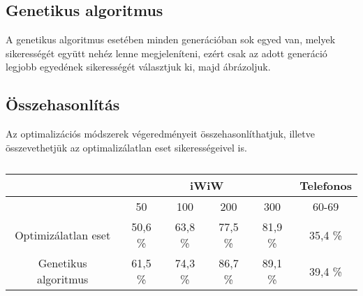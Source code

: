 \documentclass[12pt]{article}
\begin{document}
\subsection{Genetikus algoritmus}
A genetikus algoritmus esetében minden generációban sok egyed van, melyek sikerességét együtt nehéz lenne megjeleníteni, ezért csak az adott generáció legjobb egyedének sikerességét választjuk ki, majd ábrázoljuk.
\begin{figure}[H]
	\centering
	
	\caption{}
	\label{}
\end{figure}

\subsection{Összehasonlítás}
Az optimalizációs módszerek végeredményeit összehasonlíthatjuk, illetve összevethetjük az optimalizálatlan eset sikerességeivel is.
\begin{table}[H]
	\centering
	\begin{tabular}{|c|c|c|c|c|c|}
		\hline
		 & \multicolumn{4}{|c|}{iWiW} & Telefonos \\
		\hline
		 & 50 & 100 & 200 & 300 & 60-69 \\
		 \hline
		 Optimizálatlan eset & 50,6 \% & 63,8 \% & 77,5 \% & 81,9 \% & 35,4 \% \\
		 \hline
		 Genetikus algoritmus & 61,5 \% & 74,3 \% & 86,7 \% & 89,1 \% & 39,4 \% \\
		 \hline
	\end{tabular}
	\caption{}
\end{table}
\end{document}
